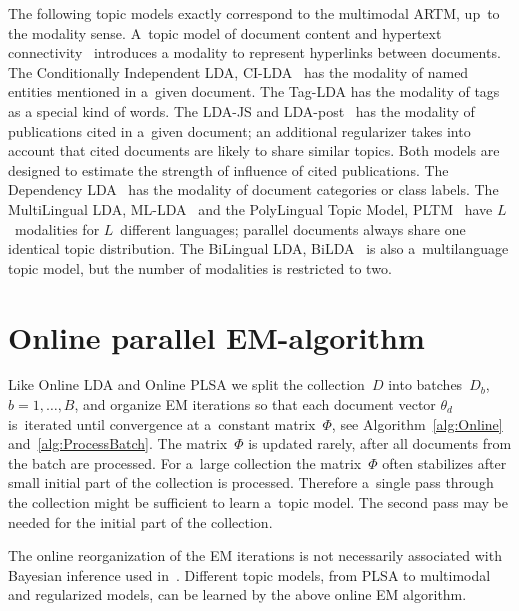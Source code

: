 \documentclass{sig-alternate-2013}
\begin{document}
The following topic models exactly correspond to the multimodal ARTM,
up~to the modality sense.
A~topic model of document content and hypertext connectivity~\cite{cohn00missing}
introduces a modality to represent hyperlinks between documents.
The Conditionally Independent LDA, CI-LDA~\cite{newman06entity}
has the modality of named entities mentioned in a~given document.
The Tag-LDA \cite{si09taglda}
has the modality of tags as a special kind of words.
The LDA-JS and LDA-post~\cite{dietz07unsupervised}
has the modality of publications cited in a~given document;
an additional regularizer takes into account that cited documents are likely to share similar topics.
Both models are designed to estimate the strength of influence of cited publications.
The Dependency LDA~\cite{rubin12statistical}
has the modality of document categories or class labels.
The MultiLingual LDA, ML-LDA~\cite{ni09mining} and
the PolyLingual Topic Model, PLTM~\cite{mimno09polylingual}
have $L$~modalities for $L$~different languages;
parallel documents always share one identical topic distribution.
The BiLingual LDA, BiLDA~\cite{smet09weblinking}
is also a~multilanguage topic model, but the number of modalities is restricted to two.


\section{Online parallel EM-algorithm}
\label{sec:Online}

Like Online LDA \cite{hoffman10online} and Online PLSA \cite{bassiou14online}
we split the collection~$D$ into batches~$D_b$, ${b=1,\dots,B}$,
and organize EM iterations so that
each document vector $\theta_d$ is~iterated until convergence at a~constant matrix~$\Phi$,
see Algorithm~\ref{alg:Online} and~\ref{alg:ProcessBatch}.
The matrix~$\Phi$ is updated rarely, after all documents from the batch are processed.
For a~large collection
the matrix~$\Phi$ often stabilizes after small initial part of the collection is processed.
Therefore a~single pass through the collection might be sufficient to learn a~topic model.
The second pass may be needed for the initial part of the collection.

The online reorganization of the EM iterations
is not necessarily associated with Bayesian inference used in~\cite{hoffman10online}.
Different topic models, from PLSA to multimodal and regularized models,
can be learned by the above online EM algorithm.
\end{document}
